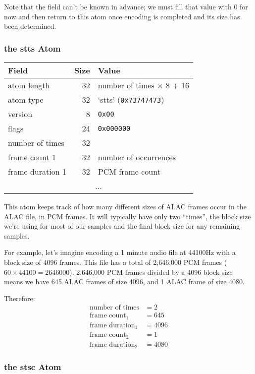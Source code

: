Note that the  field can't be known in advance;
we must fill that value with 0 for now and then
return to this atom once encoding is completed
and its size has been determined.

\clearpage

\subsubsection{the stts Atom}

\begin{table}[h]
\begin{tabular}{|l|r|l|}
\hline
Field & Size & Value \\
\hline
atom length & 32 & number of times $\times$ 8 + 16\\
atom type & 32 & `stts' (\texttt{0x73747473}) \\
\hline
version & 8 & \texttt{0x00} \\
flags & 24 & \texttt{0x000000} \\
number of times & 32 & \\
\hline
frame count 1 & 32 & number of occurrences \\
frame duration 1 & 32 & PCM frame count \\
\hline
\multicolumn{3}{|c|}{...} \\
\hline
\end{tabular}
\end{table}
This atom keeps track of how many different sizes of ALAC frames
occur in the ALAC file, in PCM frames.
It will typically have only two ``times'', the block size we're
using for most of our samples and the final block size for
any remaining samples.

For example, let's imagine encoding a 1 minute audio file
at 44100Hz with a block size of 4096 frames.
This file has a total of 2,646,000 PCM frames ($60 \times 44100 = 2646000$).
2,646,000 PCM frames divided by a 4096 block size means
we have 645 ALAC frames of size 4096, and 1 ALAC frame of size 4080.

Therefore:
\begin{align*}
\text{number of times} &= 2 \\
\text{frame count}_1 &= 645 \\
\text{frame duration}_1 &= 4096 \\
\text{frame count}_2 &= 1 \\
\text{frame duration}_2 &= 4080
\end{align*}

\subsubsection{the stsc Atom}

